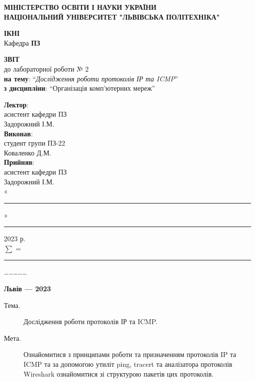 \documentclass{article}
\newcommand\subject{Організація комп’ютерних мереж}
\newcommand\lecturer{асистент кафедри ПЗ \\ Задорожний І.М.}
\newcommand\teacher{асистент кафедри ПЗ \\ Задорожний І.М.}
\newcommand\mygroup{ПЗ-22}
\newcommand\lab{2}
\newcommand\theme{Дослідження роботи протоколів ІР та ICMP}
\newcommand\purpose{Ознайомитися з принципами роботи та призначенням протоколів IP та ICMP
	та за допомогою утиліт ping, tracert та аналізатора протоколів Wireshark ознайомитися зі
	структурою пакетів цих протоколів}
\begin{document}
\begin{normalsize}
	\begin{titlepage}
		\thispagestyle{empty}
		\begin{center}
			\textbf{МІНІСТЕРСТВО ОСВІТИ І НАУКИ УКРАЇНИ\\
				НАЦІОНАЛЬНИЙ УНІВЕРСИТЕТ "ЛЬВІВСЬКА ПОЛІТЕХНІКА"}
		\end{center}
		\begin{flushright}
			\textbf{ІКНІ}\\
			Кафедра \textbf{ПЗ}
		\end{flushright}
		\vspace{200pt}
		\begin{center}
			\textbf{ЗВІТ}\\
			\vspace{10pt}
			до лабораторної роботи № \lab\\
			\textbf{на тему}: “\textit{\theme}”\\
			\textbf{з дисципліни}: “\subject”
		\end{center}
		\vspace{112pt}
		\begin{flushright}
			
			\textbf{Лектор}:\\
			\lecturer\\
			\vspace{28pt}
			\textbf{Виконав}:\\
			
			студент групи \mygroup\\
			Коваленко Д.М.\\
			\vspace{28pt}
			\textbf{Прийняв}:\\
			
			\teacher\\
			
			\vspace{28pt}
			«\rule{1cm}{0.15mm}» \rule{1.5cm}{0.15mm} 2023 р.\\
			$\sum$ = \rule{1cm}{0.15mm}……………\\
			
		\end{flushright}
		\vspace{\fill}
		\begin{center}
			\textbf{Львів — 2023}
		\end{center}
	\end{titlepage}
		
	\begin{description}
		\item[Тема.] \theme.
		\item[Мета.] \purpose.
	\end{description}


\end{normalsize}
\end{document}
